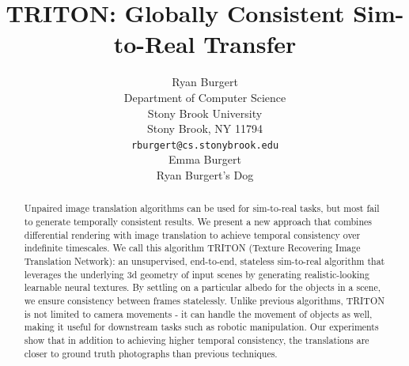 \documentclass{article}
\title{TRITON: Globally Consistent Sim-to-Real Transfer}
\author{%
	Ryan Burgert \\
	Department of Computer Science\\
	Stony Brook University\\
	Stony Brook, NY 11794 \\
	\texttt{rburgert@cs.stonybrook.edu} \\
	\And
	Emma Burgert \\
	Ryan Burgert's Dog\\
}
\begin{document}
\maketitle


\begin{abstract}


	Unpaired image translation algorithms can be used for sim-to-real tasks, but most fail to generate temporally consistent results.
	We present a new approach that combines differential rendering with image translation to achieve temporal consistency over indefinite timescales.
%
	We call this algorithm TRITON (Texture Recovering Image Translation Network): an unsupervised, end-to-end, stateless sim-to-real algorithm that 
	leverages the underlying 3d geometry of input scenes by generating realistic-looking learnable neural textures.
%
	By settling on a particular albedo for the objects in a scene, we ensure consistency between frames statelessly.
	Unlike previous algorithms, TRITON is not limited to camera movements - it can handle the movement of objects as well, making it useful for downstream tasks such as robotic manipulation.
	Our experiments show that in addition to achieving higher temporal consistency, the translations are closer to ground truth photographs than previous techniques.

\end{abstract}

\end{document}
